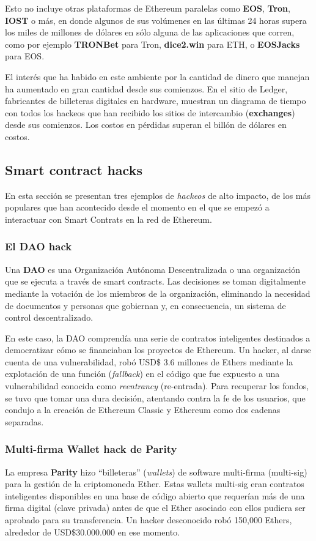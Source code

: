 Esto no incluye otras plataformas de Ethereum paralelas como \textbf{EOS}, \textbf{Tron}, \textbf{IOST} o más, en donde algunos de sus volúmenes en las últimas 24 horas supera los miles de millones de dólares en sólo alguna de las aplicaciones que corren, como por ejemplo \textbf{TRONBet} para Tron, \textbf{dice2.win} para ETH, o \textbf{EOSJacks} para EOS\cite{dappradar}.

El interés que ha habido en este ambiente por la cantidad de dinero que manejan ha aumentado en gran cantidad desde sus comienzos. En el sitio de Ledger, fabricantes de billeteras digitales en hardware, muestran un diagrama de tiempo\cite{ledgerhackstime} con todos los hackeos que han recibido los sitios de intercambio (\textbf{exchanges}) desde sus comienzos. Los costos en pérdidas superan el billón de dólares en costos.

\subsection{Smart contract hacks}
En esta sección se presentan tres ejemplos de \textit{hackeos} de alto impacto, de los más populares que han acontecido desde el momento en el que se empezó a interactuar con Smart Contrats en la red de Ethereum.


\subsubsection{El DAO hack}
Una \textbf{DAO} es una Organización Autónoma Descentralizada o una organización que se ejecuta a través de smart contracts. Las decisiones se toman digitalmente mediante la votación de los miembros de la organización, eliminando la necesidad de documentos y personas que gobiernan y, en consecuencia, un sistema de control descentralizado.

En este caso, la DAO comprendía una serie de contratos inteligentes destinados a democratizar cómo se financiaban los proyectos de Ethereum. Un hacker, al darse cuenta de una vulnerabilidad, robó USD\$ 3.6 millones de Ethers mediante la explotación de una función (\textit{fallback}) en el código que fue expuesto a una vulnerabilidad conocida como \textit{reentrancy} (re-entrada). Para recuperar los fondos, se tuvo que tomar una dura decisión, atentando contra la fe de los usuarios, que condujo a la creación de Ethereum Classic y Ethereum como dos cadenas separadas.\cite{daoattack}


\subsubsection{Multi-firma Wallet hack de Parity}
La empresa \textbf{Parity} hizo “billeteras” (\textit{wallets}) de software multi-firma (multi-sig) para la gestión de la criptomoneda Ether. Estas wallets multi-sig eran contratos inteligentes disponibles en una base de código abierto que requerían más de una firma digital (clave privada) antes de que el Ether asociado con ellos pudiera ser aprobado para su transferencia.
Un hacker desconocido robó 150,000 Ethers, alrededor de USD\$30.000.000 en ese momento\cite{parityheist}.

